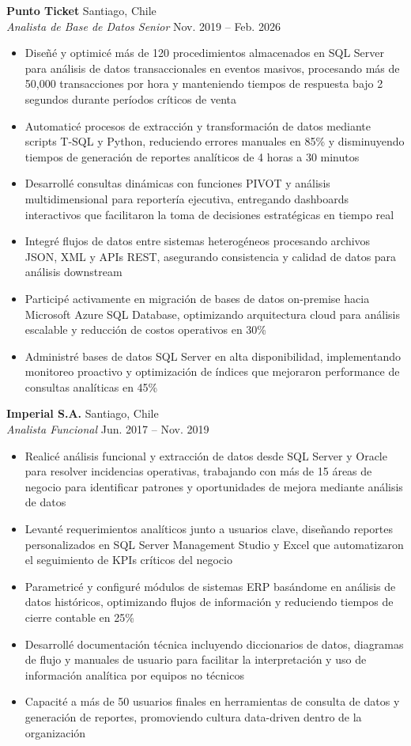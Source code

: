 \documentclass[11pt,letterpaper]{article}
\begin{document}
\textbf{Punto Ticket} \hfill Santiago, Chile\\
\textit{Analista de Base de Datos Senior} \hfill Nov. 2019 – Feb. 2026
\begin{itemize}
  \item Diseñé y optimicé más de 120 procedimientos almacenados en SQL Server para análisis de datos transaccionales en eventos masivos, procesando más de 50,000 transacciones por hora y manteniendo tiempos de respuesta bajo 2 segundos durante períodos críticos de venta
  \item Automaticé procesos de extracción y transformación de datos mediante scripts T-SQL y Python, reduciendo errores manuales en 85\% y disminuyendo tiempos de generación de reportes analíticos de 4 horas a 30 minutos
  \item Desarrollé consultas dinámicas con funciones PIVOT y análisis multidimensional para reportería ejecutiva, entregando dashboards interactivos que facilitaron la toma de decisiones estratégicas en tiempo real
  \item Integré flujos de datos entre sistemas heterogéneos procesando archivos JSON, XML y APIs REST, asegurando consistencia y calidad de datos para análisis downstream
  \item Participé activamente en migración de bases de datos on-premise hacia Microsoft Azure SQL Database, optimizando arquitectura cloud para análisis escalable y reducción de costos operativos en 30\%
  \item Administré bases de datos SQL Server en alta disponibilidad, implementando monitoreo proactivo y optimización de índices que mejoraron performance de consultas analíticas en 45\%
\end{itemize}
\vspace{2pt}
\textbf{Imperial S.A.} \hfill Santiago, Chile\\
\textit{Analista Funcional} \hfill Jun. 2017 – Nov. 2019
\begin{itemize}
  \item Realicé análisis funcional y extracción de datos desde SQL Server y Oracle para resolver incidencias operativas, trabajando con más de 15 áreas de negocio para identificar patrones y oportunidades de mejora mediante análisis de datos
  \item Levanté requerimientos analíticos junto a usuarios clave, diseñando reportes personalizados en SQL Server Management Studio y Excel que automatizaron el seguimiento de KPIs críticos del negocio
  \item Parametricé y configuré módulos de sistemas ERP basándome en análisis de datos históricos, optimizando flujos de información y reduciendo tiempos de cierre contable en 25\%
  \item Desarrollé documentación técnica incluyendo diccionarios de datos, diagramas de flujo y manuales de usuario para facilitar la interpretación y uso de información analítica por equipos no técnicos
  \item Capacité a más de 50 usuarios finales en herramientas de consulta de datos y generación de reportes, promoviendo cultura data-driven dentro de la organización
\end{itemize}
\end{document}
